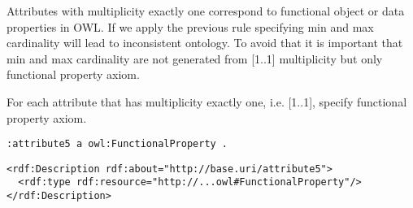 Attributes with multiplicity exactly one correspond to functional object or data properties in OWL. If we apply the previous rule specifying min and max cardinality will lead to inconsistent ontology. To avoid that it is important that min and max cardinality are not generated from [1..1] multiplicity but only functional property axiom.

\begin{trule}
	\label{rule:attribute-rc-multiplicity-one}
	For each attribute that has multiplicity exactly one, i.e. [1..1], specify functional property axiom.
\end{trule}

\vspace{\parskip}
\begin{minipage}[b]{.384\textwidth}
\begin{lstlisting}[language=Turtle, caption={Declaring a functional property in Turtle syntax}, captionpos=b]
:attribute5 a owl:FunctionalProperty .
\end{lstlisting}
\end{minipage}%
\quad\vspace{-\parskip}
\begin{minipage}[b]{.6\textwidth}
\begin{lstlisting}[language=RDF/XML, caption={Declaring a functional property in RDF/XML syntax}, captionpos=b]
<rdf:Description rdf:about="http://base.uri/attribute5">
  <rdf:type rdf:resource="http://...owl#FunctionalProperty"/>
</rdf:Description>
\end{lstlisting}
\end{minipage}
\vspace{-\parskip}